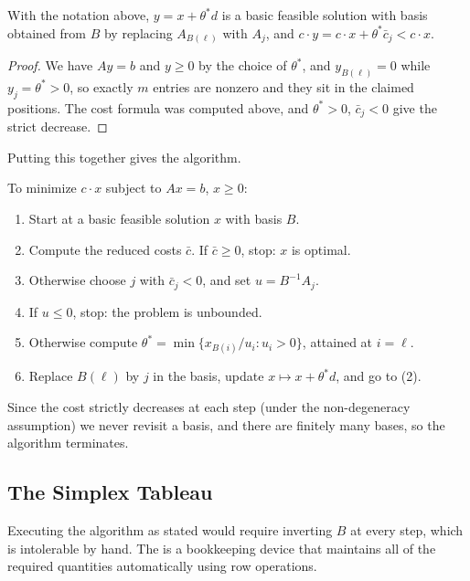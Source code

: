 \documentclass[a4paper]{scrartcl}
\begin{document}
\begin{theorem}
    With the notation above, $y = x + \theta^* d$ is a basic feasible solution with basis obtained from $B$ by replacing $A_{B(\ell)}$ with $A_j$, and $c\cdot y = c\cdot x + \theta^*\bar c_j < c\cdot x$.
\end{theorem}
\begin{proof}
    We have $Ay = b$ and $y \geq 0$ by the choice of $\theta^*$, and $y_{B(\ell)} = 0$ while $y_j = \theta^* > 0$, so exactly $m$ entries are nonzero and they sit in the claimed positions. The cost formula was computed above, and $\theta^* > 0$, $\bar c_j < 0$ give the strict decrease.
\end{proof}

Putting this together gives the algorithm.

\begin{definition}
    To minimize $c\cdot x$ subject to $Ax = b$, $x \geq 0$:
    \begin{enumerate}[label=(\arabic*)]
        \item Start at a basic feasible solution $x$ with basis $B$.
        \item Compute the reduced costs $\bar c$. If $\bar c \geq 0$, stop: $x$ is optimal.
        \item Otherwise choose $j$ with $\bar c_j < 0$, and set $u = B^{-1}A_j$.
        \item If $u \leq 0$, stop: the problem is unbounded.
        \item Otherwise compute $\theta^* = \min\{x_{B(i)}/u_i : u_i > 0\}$, attained at $i = \ell$.
        \item Replace $B(\ell)$ by $j$ in the basis, update $x \mapsto x + \theta^* d$, and go to (2).
    \end{enumerate}
\end{definition}

Since the cost strictly decreases at each step (under the non-degeneracy assumption) we never revisit a basis, and there are finitely many bases, so the algorithm terminates.

\subsection{The Simplex Tableau}

Executing the algorithm as stated would require inverting $B$ at every step, which is intolerable by hand. The  is a bookkeeping device that maintains all of the required quantities automatically using row operations.
\end{document}
